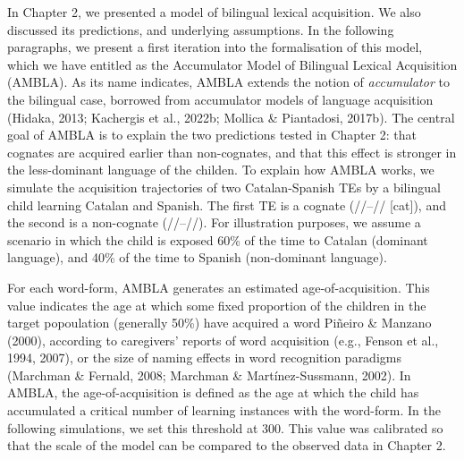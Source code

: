 \documentclass[
  12pt,
  b5paperpaper,
  twoside]{scrreprt}
\begin{document}
In Chapter 2, we presented a model of bilingual lexical acquisition. We
also discussed its predictions, and underlying assumptions. In the
following paragraphs, we present a first iteration into the
formalisation of this model, which we have entitled as the Accumulator
Model of Bilingual Lexical Acquisition (AMBLA). As its name indicates,
AMBLA extends the notion of \emph{accumulator} to the bilingual case,
borrowed from accumulator models of language acquisition (Hidaka, 2013;
Kachergis et al., 2022b; Mollica \& Piantadosi, 2017b). The central goal
of AMBLA is to explain the two predictions tested in Chapter 2: that
cognates are acquired earlier than non-cognates, and that this effect is
stronger in the less-dominant language of the childen. To explain how
AMBLA works, we simulate the acquisition trajectories of two
Catalan-Spanish TEs by a bilingual child learning Catalan and Spanish.
The first TE is a cognate (//--//
{[}cat{]}), and the second is a non-cognate
(//--//). For illustration purposes, we
assume a scenario in which the child is exposed 60\% of the time to
Catalan (dominant language), and 40\% of the time to Spanish
(non-dominant language).

For each word-form, AMBLA generates an estimated age-of-acquisition.
This value indicates the age at which some fixed proportion of the
children in the target popoulation (generally 50\%) have acquired a word
Piñeiro \& Manzano (2000), according to caregivers' reports of word
acquisition (e.g., Fenson et al., 1994, 2007), or the size of naming
effects in word recognition paradigms (Marchman \& Fernald, 2008;
Marchman \& Martínez-Sussmann, 2002). In AMBLA, the age-of-acquisition
is defined as the age at which the child has accumulated a critical
number of learning instances with the word-form. In the following
simulations, we set this threshold at 300. This value was calibrated so
that the scale of the model can be compared to the observed data in
Chapter 2.
\end{document}
